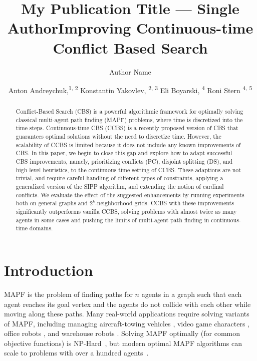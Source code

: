 \documentclass[letterpaper]{article} %
\title{My Publication Title --- Single Author}
\author {
    Author Name \\
}
\title{Improving Continuous-time Conflict Based Search}
\author {

        Anton Andreychuk,\textsuperscript{\rm 1, 2}
        Konstantin Yakovlev, \textsuperscript{\rm 2, 3}
        Eli Boyarski, \textsuperscript{\rm 4} 
        Roni Stern \textsuperscript{\rm 4, 5}\\
}
\newcommand{\mapf}{\ac{MAPF}\xspace}
\begin{document}
\maketitle


\begin{abstract}
Conflict-Based Search (CBS) is a powerful algorithmic framework for optimally solving classical multi-agent path finding (MAPF) problems, where time is discretized into the time steps. 
Continuous-time CBS (CCBS) is a recently proposed version of CBS that guarantees optimal solutions without the need to discretize time. 
However, the  scalability of CCBS is limited because it does not include any known improvements of CBS. 
In this paper, we begin to close this gap and explore how to adapt successful CBS improvements, namely, prioritizing conflicts (PC), disjoint splitting (DS), and high-level heuristics, to the continuous time setting of CCBS. 
These adaptions are not trivial, and require careful handling of different types of constraints, applying a generalized version of the \acf{SIPP} algorithm, and extending the notion of cardinal conflicts.
We evaluate the effect of the suggested enhancements by running experiments both on general graphs and $2^k$-neighborhood grids. 
CCBS with these improvements significantly outperforms vanilla CCBS, 
solving problems with almost twice as many agents in some cases and 
pushing the limits of multi-agent path finding in continuous-time domains.

\end{abstract}

\section{Introduction}

\acf{MAPF} is the problem of finding paths for $n$ agents in a graph such that 
each agent reaches its goal vertex and the agents do not collide with each other while moving along these paths. 
Many real-world applications require solving variants of \mapf, 
including managing aircraft-towing vehicles \cite{MorrisPLMMKK16}, video game characters \cite{Silver05}, office robots \cite{VelosoBCR15}, and warehouse robots \cite{WurmanDM07}. 
Solving \mapf optimally (for common objective functions) is NP-Hard~\cite{surynek2010optimization,yu2013structure}, 
but modern optimal \mapf algorithms can scale to problems with over a hundred agents~\cite{sharon2015conflict,BoyarskiFSSTBS15,felner2018adding,BCP,lazy-cbs,SurynekFSB16}.
\end{document}
